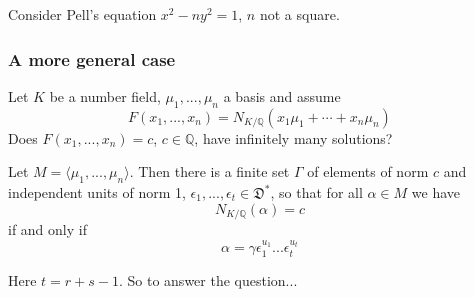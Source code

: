 \documentclass{beamer}
\newcommand{\mfrak}[1]{\mathfrak{#1}}
\newcommand{\mbb}[1]{\mathbb{#1}}
\numberwithin{equation}{section}
\begin{document}
\begin{frame}
	Consider Pell's equation $x^2 - ny^2 = 1$, $n$ not a square.
\end{frame}


\begin{frame}
	\frametitle{A more general case}
	Let $K$ be a number field, $\mu_1, ..., \mu_n$ a basis and assume $$F(x_1, ..., x_n) = N_{K / \mbb Q}(x_1 \mu_1 + \cdots + x_n \mu_n)$$
	Does $F(x_1, ..., x_n) = c$, $c \in \mbb Q$, have infinitely many solutions? 
\end{frame}

\begin{frame}
	Let $M = \langle \mu_1, ..., \mu_n \rangle$. Then there is a finite set $\Gamma$ of elements of norm $c$ and independent units of norm 1, $\epsilon_1, ..., \epsilon_t \in \mfrak D^*$, so that 
	for all $\alpha \in M$ we have
	$$N_{K / \mbb Q}(\alpha) = c$$
	if and only if 
	$$\alpha = \gamma \epsilon_1^{u_1} ... \epsilon_t^{u_t}$$
	
	Here $t = r+s -1$. So to answer the question...\\ 
	
	

\end{frame}
\end{document}
